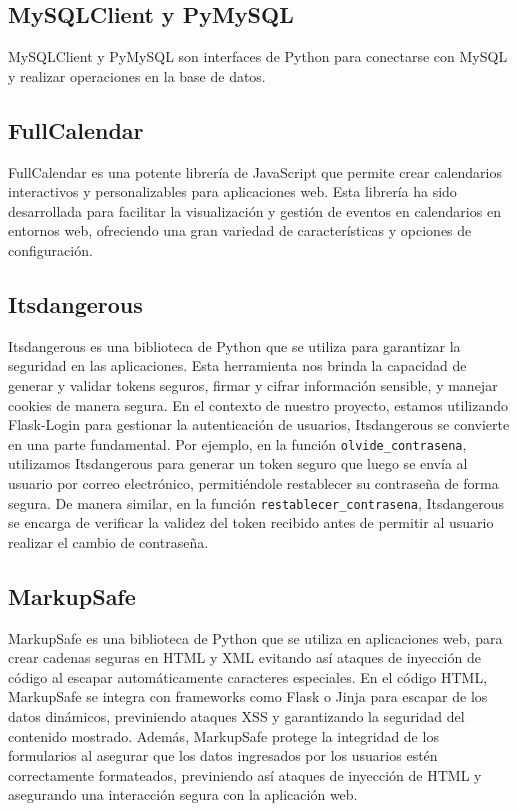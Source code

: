 \documentclass[a4paper, 12pt]{book}
\begin{document}
\subsection{MySQLClient y PyMySQL} 
\label{subsec:pymysql} 
MySQLClient y PyMySQL son interfaces de Python para conectarse con MySQL y realizar operaciones en la base de datos.
\subsection{FullCalendar}
\label{subsec:fullcalendar}
FullCalendar es una potente librería de JavaScript que permite crear calendarios interactivos y personalizables para aplicaciones web. 
Esta librería ha sido desarrollada para facilitar la visualización y gestión de eventos en calendarios en entornos web, ofreciendo una 
gran variedad de características y opciones de configuración.

\subsection{Itsdangerous} 
\label{subsec:itsdangerous} 
Itsdangerous es una biblioteca de Python que se utiliza para garantizar la seguridad en las aplicaciones. Esta herramienta nos brinda 
la capacidad de generar y validar tokens seguros, firmar y cifrar información sensible, y manejar cookies de manera segura. 
En el contexto de nuestro proyecto, estamos utilizando Flask-Login para gestionar la autenticación de usuarios, Itsdangerous se 
convierte en una parte fundamental. Por ejemplo, en la función \texttt{olvide\_contrasena}, utilizamos Itsdangerous para generar un token 
seguro que luego se envía al usuario por correo electrónico, permitiéndole restablecer su contraseña de forma segura. De manera 
similar, en la función \texttt{restablecer\_contrasena}, Itsdangerous se encarga de verificar la validez del token recibido antes de permitir 
al usuario realizar el cambio de contraseña.

\subsection{MarkupSafe} 
\label{subsec:markupsafe} 
MarkupSafe es una biblioteca de Python que se utiliza en aplicaciones web, para crear cadenas seguras en HTML y XML evitando así ataques de inyección de código 
al escapar automáticamente caracteres especiales. En el código HTML, MarkupSafe se integra con frameworks como Flask o Jinja para escapar de los datos dinámicos, 
previniendo ataques XSS y garantizando la seguridad del contenido mostrado. Además, MarkupSafe protege la integridad de los formularios al asegurar que los datos 
ingresados por los usuarios estén correctamente formateados, previniendo así ataques de inyección de HTML y asegurando una interacción segura con la aplicación web. 
\end{document}
